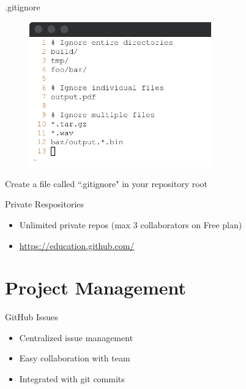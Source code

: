 \documentclass{beamer}
\begin{document}
    \begin{frame}{.gitignore}
        \begin{figure}
            \centering
            \includegraphics[width=0.7\textwidth]{figures/gitignore.png}
        \end{figure}
        \centering
        Create a file called ``.gitignore" in your repository root
    \end{frame}

    \begin{frame}{Private Respositories}
        \begin{itemize}
            \item Unlimited private repos (max 3 collaborators on Free plan)
            \item \url{https://education.github.com/}
        \end{itemize}
    \end{frame}

    \section{Project Management}\label{sec:project-management}
    \begin{frame}{GitHub Issues}
        \begin{itemize}
            \item Centralized issue management
            \item Easy collaboration with team
            \item Integrated with git commits
        \end{itemize}
    \end{frame}
\end{document}
